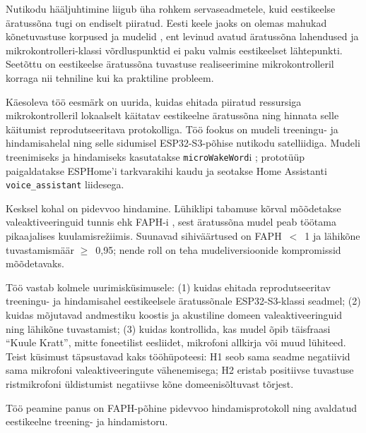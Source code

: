Nutikodu hääljuhtimine liigub üha rohkem servaseadmetele, kuid eestikeelse äratussõna tugi on endiselt piiratud. Eesti keele jaoks on olemas mahukad kõnetuvastuse korpused ja mudelid \cite{taltech-asr-data2024,riigikogu-stenograms2025}, ent levinud avatud äratussõna lahendused \cite{openwakeword2026,picovoice-benchmark2026} ja mikrokontrolleri-klassi võrdluspunktid \cite{speechcommands2018,microwakeword2026} ei paku valmis eestikeelset lähtepunkti. Seetõttu on eestikeelse äratussõna tuvastuse realiseerimine mikrokontrolleril korraga nii tehniline kui ka praktiline probleem.

Käesoleva töö eesmärk on uurida, kuidas ehitada piiratud ressursiga mikrokontrolleril lokaalselt käitatav eestikeelne äratussõna ning hinnata selle käitumist reprodutseeritava protokolliga. Töö fookus on mudeli treeningu- ja hindamisahelal ning selle sidumisel ESP32-S3-põhise nutikodu satelliidiga. Mudeli treenimiseks ja hindamiseks kasutatakse \texttt{microWakeWord}i \cite{microwakeword2026,tensorflow2015}; prototüüp paigaldatakse ESPHome'i tarkvarakihi kaudu \cite{esphome2026} ja seotakse Home Assistanti \cite{homeassistant2026} \texttt{voice\_assistant} liidesega.

Kesksel kohal on pidevvoo hindamine. Lühiklipi tabamuse kõrval mõõdetakse valeaktiveeringuid tunnis ehk FAPH-i \cite{lopezespejo2021deepkws}, sest äratussõna mudel peab töötama pikaajalises kuulamisrežiimis. Suunavad sihiväärtused on FAPH~$<$~1 ja lähikõne tuvastamismäär $\geq$~0{,}95; nende roll on teha mudeliversioonide kompromissid mõõdetavaks.

Töö vastab kolmele uurimisküsimusele: (1) kuidas ehitada reprodutseeritav treeningu- ja hindamisahel eestikeelsele äratussõnale ESP32-S3-klassi seadmel; (2) kuidas mõjutavad andmestiku koostis ja akustiline domeen valeaktiveeringuid ning lähikõne tuvastamist; (3) kuidas kontrollida, kas mudel õpib täisfraasi \enquote{Kuule Kratt}, mitte foneetilist eesliidet, mikrofoni allkirja või muud lühiteed. Teist küsimust täpsustavad kaks tööhüpoteesi: H1 seob sama seadme negatiivid sama mikrofoni valeaktiveeringute vähenemisega; H2 eristab positiivse tuvastuse ristmikrofoni üldistumist negatiivse kõne domeenisõltuvast tõrjest.

Töö peamine panus on FAPH-põhine pidevvoo hindamisprotokoll ning avaldatud eestikeelne treening- ja hindamistoru.\label{sec:evidence-base}
